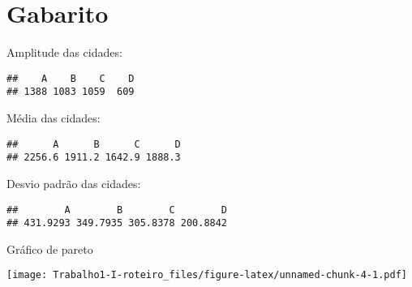 \documentclass[]{article}
\begin{document}
\section{Gabarito}\label{gabarito}

Amplitude das cidades:

\begin{verbatim}
##    A    B    C    D 
## 1388 1083 1059  609
\end{verbatim}

Média das cidades:

\begin{verbatim}
##      A      B      C      D 
## 2256.6 1911.2 1642.9 1888.3
\end{verbatim}

Desvio padrão das cidades:

\begin{verbatim}
##        A        B        C        D 
## 431.9293 349.7935 305.8378 200.8842
\end{verbatim}

Gráfico de pareto

\texttt{[image: Trabalho1-I-roteiro\_files/figure-latex/unnamed-chunk-4-1.pdf]}\\
\end{document}
